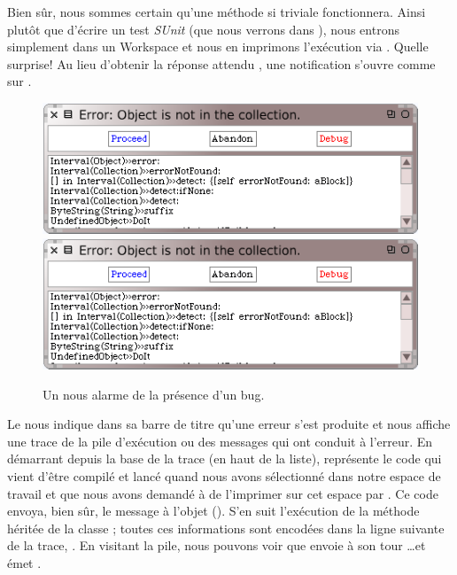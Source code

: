 \documentclass[a4paper,10pt,twoside]{book}
\begin{document}
Bien s\^ur, nous sommes certain qu'une m\'ethode si triviale fonctionnera.
Ainsi plut\^ot que d'\'ecrire un test \emph{SUnit} 
(que nous verrons dans ),
nous entrons simplement  dans un Workspace
et nous en imprimons l'ex\'ecution via .
Quelle surprise! Au lieu d'obtenir la r\'eponse attendu , 
une notification  s'ouvre comme sur
.

\begin{figure}[btp]
	\begin{center}
	\ifluluelse
		{\includegraphics[width=\textwidth]{PreDebugWindow}}
		{\includegraphics[scale=0.7]{PreDebugWindow}}
	\end{center}
	\caption{Un  nous alarme de la pr\'esence d'un bug.}
	\label{fig:PreDebugWindow}
\end{figure}

Le  nous indique dans sa barre de titre
qu'une erreur s'est produite et nous affiche une trace de la pile d'ex\'ecution
ou  des messages qui ont conduit \`a l'erreur.
En d\'emarrant depuis la base de la trace
(en haut de la liste),
  repr\'esente le code qui vient d'\^etre compil\'e
et lanc\'e quand nous avons s\'electionn\'e  
dans notre espace de travail et que nous avons
demand\'e \`a \sq de l'imprimer sur cet espace par .
Ce code envoya, bien s\^ur, le message  \`a
l'objet  ().
S'en suit l'ex\'ecution de la m\'ethode  h\'erit\'ee de la
classe ;
toutes ces informations sont encod\'ees dans la ligne suivante de la trace,
.
En visitant la pile, nous pouvons voir que  envoie
\`a son tour \ldots et  \'emet .
\end{document}
